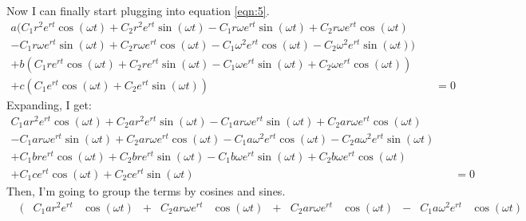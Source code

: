 \documentclass[11pt]{article}
\begin{document}
\begin{enumerate}[label={\textbf{\arabic*.}}]
{\begin{enumerate}[label={\textbf{(\alph*)}}]
{\begin{align*}
\begin{split}
                        \end{split}
                    \end{align*}
                    Now I can finally start plugging into equation \ref{eqn:5}.
                    \begin{equation*}
                        \begin{split}
                            a(C_1r^2e^{rt}\cos(\omega t)+C_2r^2e^{rt}\sin(\omega t)-C_1r\omega e^{rt}\sin(\omega t)+C_2r\omega e^{rt}\cos(\omega t)\quad&\\
                            -C_1r\omega e^{rt}\sin(\omega t)+C_2r\omega e^{rt}\cos(\omega t)-C_1\omega^2e^{rt}\cos(\omega t)-C_2\omega^2e^{rt}\sin(\omega t))\quad&\\
                            +b(C_1re^{rt}\cos(\omega t)+C_2re^{rt}\sin(\omega t)-C_1\omega e^{rt}\sin(\omega t)+C_2\omega e^{rt}\cos(\omega t))\quad&\\
                            +c(C_1e^{rt}\cos(\omega t)+C_2e^{rt}\sin(\omega t))&=0
                        \end{split}
                    \end{equation*}
                    Expanding, I get:
                    \begin{equation*}
                        \begin{split}
                            C_1ar^2e^{rt}\cos(\omega t)+C_2ar^2e^{rt}\sin(\omega t)-C_1ar\omega e^{rt}\sin(\omega t)+C_2ar\omega e^{rt}\cos(\omega t)\quad&\\
                            -C_1ar\omega e^{rt}\sin(\omega t)+C_2ar\omega e^{rt}\cos(\omega t)-C_1a\omega^2e^{rt}\cos(\omega t)-C_2a\omega^2e^{rt}\sin(\omega t)\quad&\\
                            +C_1bre^{rt}\cos(\omega t)+C_2bre^{rt}\sin(\omega t)-C_1b\omega e^{rt}\sin(\omega t)+C_2b\omega e^{rt}\cos(\omega t)\quad&\\
                            +C_1ce^{rt}\cos(\omega t)+C_2ce^{rt}\sin(\omega t)&=0
                        \end{split}
                    \end{equation*}
                    Then, I'm going to group the terms by cosines and sines.
                    \begin{equation*}
                        \begin{alignedat}{7}
                            &(&C_1ar^2e^{rt}&\cos(\omega t)&{}+{}&C_2ar\omega e^{rt}&\cos(\omega t)&{}+{}&C_2ar\omega e^{rt}&\cos(\omega t)&{}-{}&C_1a\omega^2e^{rt}&\cos(\omega t) \\

\end{alignedat}
\end{equation*}}
\end{enumerate}}
\end{enumerate}
\end{document}
